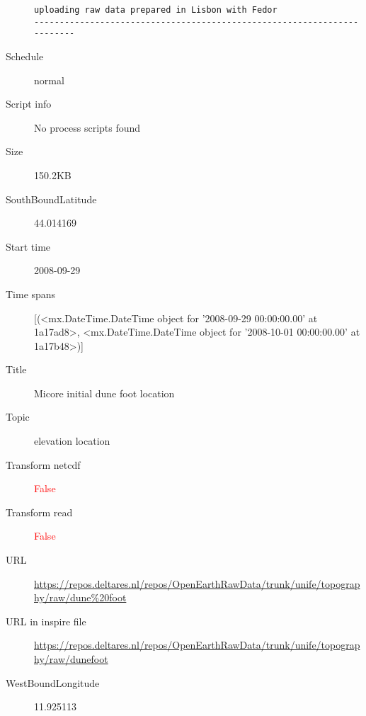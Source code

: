 \documentclass[9]{report}
\begin{document}
\begin{description}
\begin{verbatim}
uploading raw data prepared in Lisbon with Fedor
------------------------------------------------------------------------

\end{verbatim}
  \item[Schedule] normal
  \item[Script info] No process scripts found
  \item[Size] 150.2KB
  \item[SouthBoundLatitude] 44.014169
  \item[Start time] 2008-09-29
  \item[Time spans] [(<mx.DateTime.DateTime object for '2008-09-29 00:00:00.00' at 1a17ad8>, <mx.DateTime.DateTime object for '2008-10-01 00:00:00.00' at 1a17b48>)]
  \item[Title]  Micore initial dune foot location 
  \item[Topic] elevation location
  \item[Transform netcdf] \textcolor{red}{False}
  \item[Transform read] \textcolor{red}{False}
  \item[URL] \href{https://repos.deltares.nl/repos/OpenEarthRawData/trunk/unife/topography/raw/dune\%20foot}{https://repos.deltares.nl/repos/OpenEarthRawData/trunk/unife/topography/raw/dune\%20foot}
  \item[URL in inspire file] \href{https://repos.deltares.nl/repos/OpenEarthRawData/trunk/unife/topography/raw/dunefoot}{https://repos.deltares.nl/repos/OpenEarthRawData/trunk/unife/topography/raw/dunefoot}
  \item[WestBoundLongitude] 11.925113
\end{description}
\end{document}
